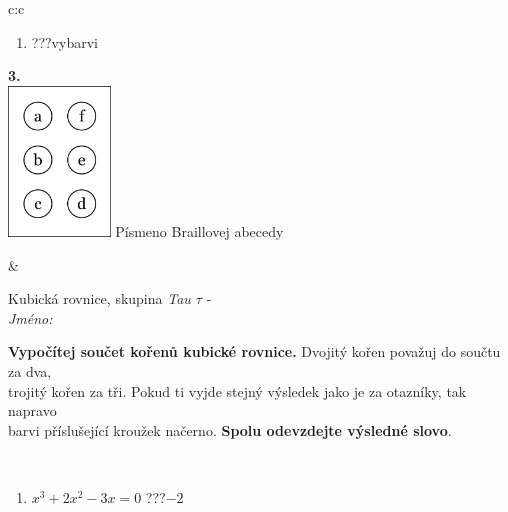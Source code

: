 \documentclass[10pt]{report}
\begin{document}
\begin{tabular}{c:c}
\begin{minipage}[c][104.5mm][t]{0.5\linewidth}
\begin{center}
\begin{minipage}{0.79\linewidth}
\begin{center}
\begin{varwidth}{\linewidth}
\begin{enumerate}
\item \quad \dotfill\; ???\;\dotfill \quad vybarvi
\end{enumerate}
\end{varwidth}
\end{center}
\end{minipage}
\begin{minipage}{0.20\linewidth}
\begin{center}
{\Huge\bfseries 3.} \\[2mm]
\includegraphics[height=40mm]{../images/braille.png}
{\small Písmeno Braillovej abecedy}
\end{center}
\end{minipage}
\end{center}
\end{minipage}
&
\begin{minipage}[c][104.5mm][t]{0.5\linewidth}
\begin{center}
\vspace{7mm}
{\huge Kubická rovnice, skupina \textit{Tau $\tau$} -}\\[5mm]
\textit{Jméno:}\phantom{xxxxxxxxxxxxxxxxxxxxxxxxxxxxxxxxxxxxxxxxxxxxxxxxxxxxxxxxxxxxxxxxx}\\[5mm]
\begin{minipage}{0.95\linewidth}
\begin{center}
\textbf{Vypočítej součet kořenů kubické rovnice.} Dvojitý kořen považuj do součtu za dva,\\trojitý kořen za tři. Pokud ti vyjde stejný výsledek jako je za otazníky, tak napravo\\barvi příslušející kroužek načerno. \textbf{Spolu odevzdejte výsledné slovo}.
\end{center}
\end{minipage}
\\[1mm]
\begin{minipage}{0.79\linewidth}
\begin{center}
\begin{varwidth}{\linewidth}
\begin{enumerate}
\Large
\item $x^3+2x^2-3x=0$\quad \dotfill\; ???\;\dotfill \quad $-2$

\end{enumerate}
\end{varwidth}
\end{center}
\end{minipage}
\end{center}
\end{minipage}
\end{tabular}
\end{document}
